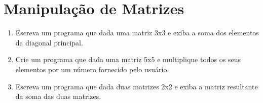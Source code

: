 \documentclass[a4paper, 12pt]{article}
\begin{document}
\section*{Manipulação de Matrizes}

\begin{enumerate}
    \item Escreva um programa que dada uma matriz 3x3 e exiba a soma dos elementos da diagonal principal.
    \item Crie um programa que dada uma matriz 5x5 e multiplique todos os seus elementos por um número fornecido pelo usuário.
    \item Escreva um programa que dada duas matrizes 2x2 e exiba a matriz resultante da soma das duas matrizes.
\end{enumerate}
\end{document}
